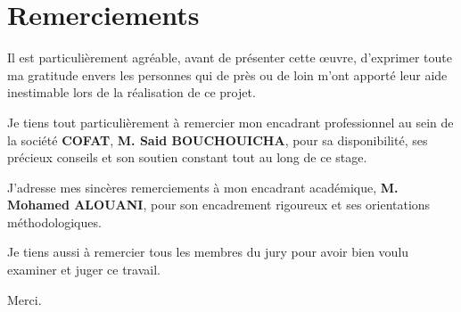 \chapter*{\huge Remerciements}

\begin{center}
\it \Large

Il est particulièrement agréable, avant de présenter cette œuvre, d'exprimer toute ma gratitude envers les personnes qui de près ou de loin m'ont apporté leur aide inestimable lors de la réalisation de ce projet.

Je tiens tout particulièrement à remercier mon encadrant professionnel au sein de la société \textbf{COFAT}, \textbf{M. Said BOUCHOUICHA}, pour sa disponibilité, ses précieux conseils et son soutien constant tout au long de ce stage.

J'adresse mes sincères remerciements à mon encadrant académique, \textbf{M. Mohamed ALOUANI}, pour son encadrement rigoureux et ses orientations méthodologiques.

Je tiens aussi à remercier tous les membres du jury pour avoir bien voulu examiner et juger ce travail.

\vspace{1.5cm}
Merci.

\end{center}